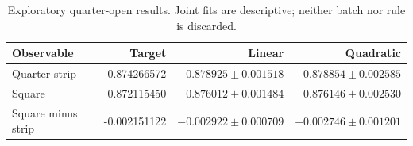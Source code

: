 \begin{table}[htbp]\centering\small\caption{Exploratory quarter-open results. Joint fits are descriptive; neither batch nor rule is discarded.}
\begin{tabular}{lrrr}\toprule
Observable & Target & Linear & Quadratic\\\midrule
Quarter strip & 0.874266572 & $0.878925\pm0.001518$ & $0.878854\pm0.002585$\\
Square & 0.872115450 & $0.876012\pm0.001484$ & $0.876146\pm0.002530$\\
Square minus strip & -0.002151122 & $-0.002922\pm0.000709$ & $-0.002746\pm0.001201$\\
\bottomrule\end{tabular}\end{table}
